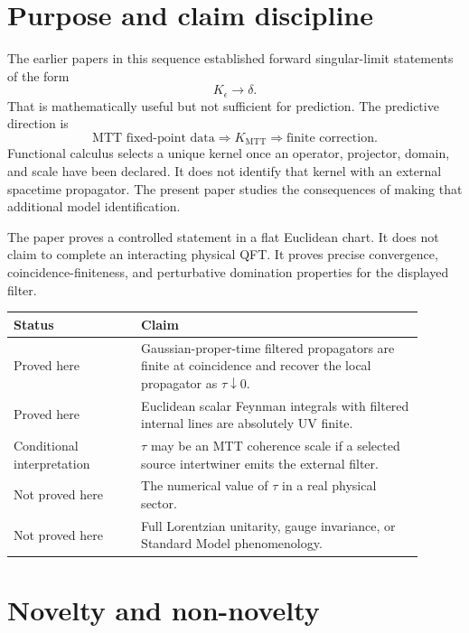 \documentclass[11pt]{article}
\begin{document}
\tableofcontents

\section{Purpose and claim discipline}

The earlier papers in this sequence established forward singular-limit statements of the form
\[
        K_\epsilon \longrightarrow \delta .
\]
That is mathematically useful but not sufficient for prediction. The predictive direction is
\[
        \text{MTT fixed-point data}
        \Longrightarrow
        K_{\mathrm{MTT}}
        \Longrightarrow
        \text{finite correction}.
\]
Functional calculus selects a unique kernel once an operator, projector, domain, and scale
have been declared.  It does not identify that kernel with an external spacetime propagator.
The present paper studies the consequences of making that additional model identification.

The paper proves a controlled statement in a flat Euclidean chart.  It does not claim to
complete an interacting physical QFT.  It proves precise convergence, coincidence-finiteness,
and perturbative domination properties for the displayed filter.

\begin{center}
\begin{tabular}{p{0.28\linewidth}p{0.62\linewidth}}
\toprule
Status & Claim \\
\midrule
Proved here & Gaussian-proper-time filtered propagators are finite at coincidence and recover the local propagator as \(\tau\downarrow0\). \\
Proved here & Euclidean scalar Feynman integrals with filtered internal lines are absolutely UV finite. \\
Conditional interpretation & \(\tau\) may be an MTT coherence scale if a selected source intertwiner emits the external filter. \\
Not proved here & The numerical value of \(\tau\) in a real physical sector. \\
Not proved here & Full Lorentzian unitarity, gauge invariance, or Standard Model phenomenology. \\
\bottomrule
\end{tabular}
\end{center}


\section{Novelty and non-novelty}
\end{document}
